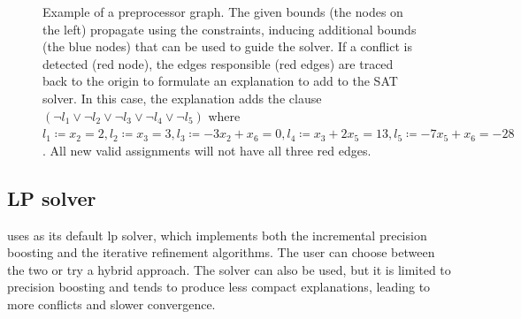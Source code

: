 \documentclass[runningheads]{llncs}
\begin{document}
\begin{figure}[h]
    \caption{Example of a preprocessor graph. The given bounds (the nodes on the left) propagate using the constraints, inducing additional bounds (the blue nodes) that can be used to guide the solver.
        If a conflict is detected (red node), the edges responsible (red edges) are traced back to the origin to formulate an explanation to add to the SAT solver.
        In this case, the explanation adds the clause $(\neg l_1 \lor \neg l_2 \lor \neg l_3 \lor \neg l_4 \lor \neg l_5)$ where $l_1 \coloneqq x_2 = 2, l_2 \coloneqq x_3 = 3, l_3 \coloneqq -3x_2 + x_6 = 0, l_4 \coloneqq x_3 + 2x_5 = 13, l_5 \coloneqq -7x_5 + x_6 = -28$.
        All new valid assignments will not have all three red edges.}
    \label{dg:preprocessor}
\end{figure}

\subsection{LP solver}

\dlinear uses \soplex \cite{soplex} as its default \gls{lp} solver, which implements both the incremental precision boosting and the iterative refinement algorithms.
The user can choose between the two or try a hybrid approach. The \qsoptex \cite{ref:precision-boosting} solver can also be used, but it is limited to precision boosting and tends to produce less compact explanations, leading to more conflicts and slower convergence.
\end{document}

